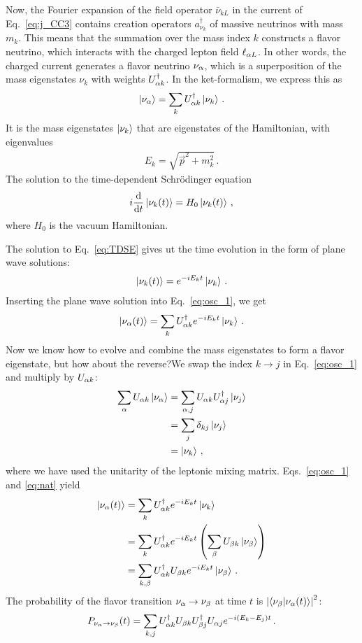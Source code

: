 Now, the Fourier expansion of the field operator $\bar{\nu}_{k L}$ in the current of Eq.~\ref{eq:j_CC3} contains creation operators $a^\dagger_{\nu_k}$
of massive neutrinos with mass $m_k$. This means that the summation over the mass index $k$ constructs a flavor neutrino, which interacts with the charged lepton field $\ell_{\alpha L}$.
In other words, the charged current generates a flavor neutrino $\nu_\alpha$, which is a superposition of the mass eigenstates 
$\nu_k$ with weights $U_{\alpha k}^\dagger$. In the ket-formalism, we express this as
\begin{align}\label{eq:osc_1}
    \ket{\nu_\alpha} = \sum_k U^\dagger_{\alpha k} \ket{\nu_k}\,.
\end{align}
It is the mass eigenstates $\ket{\nu_k}$ that are eigenstates of the Hamiltonian, with eigenvalues
\begin{align}\label{eq:disp}
    E_k = \sqrt{\vec{p}^2 + m_k^2}\,.
\end{align}
The solution to the time-dependent Schrödinger equation 
\begin{align}\label{eq:TDSE}
    i \dv{}{t} \ket{\nu_k(t)} = H_0\ket{\nu_k(t)}\,,
\end{align}
where $H_0$ is the vacuum Hamiltonian. 

The solution to Eq.~\ref{eq:TDSE} gives ut the time evolution
in the form of plane wave solutions: 
\begin{align}
    \ket{\nu_k(t)} = e^{-iE_kt}\ket{\nu_k}\,.
\end{align}
Inserting the plane wave solution into Eq.~\ref{eq:osc_1}, we get 
\begin{align}\label{eq:nat}
    \ket{\nu_\alpha(t)} = \sum_k U^\dagger_{\alpha k} e^{-iE_kt}\ket{\nu_k}\,.
\end{align}
Now we know how to evolve and combine the mass eigenstates to form a flavor eigenstate, but how about the reverse?We swap the index $k\to j$ in Eq.~\ref{eq:osc_1} and multiply by $U_{\alpha k}$:
\begin{align}\label{eq:osc_k}
    \sum_\alpha U_{\alpha k}\ket{\nu_\alpha} &= \sum_{\alpha, j} U_{\alpha k} U_{\alpha j}^\dagger \ket{\nu_j} \nonumber \\
                              &= \sum_{j} \delta_{kj} \ket{\nu_j} \nonumber \\
                              &= \ket{\nu_k}\,,
\end{align}
where we have used the unitarity of the leptonic mixing matrix. Eqs.~\ref{eq:osc_1} and \ref{eq:nat} yield 
\begin{align}
    \ket{\nu_\alpha(t)} &= \sum_k U^\dagger_{\alpha k} e^{-iE_kt}\ket{\nu_k} \nonumber \\
                 &= \sum_k U^\dagger_{\alpha k} e^{-iE_kt}\left(\sum_\beta U_{\beta k}\ket{\nu_\beta}\right) \nonumber \\
                 &= \sum_{k,\beta} U^\dagger_{\alpha k}U_{\beta k} e^{-iE_kt} \ket{\nu_\beta}\,.
\end{align}
The probability of the flavor transition $\nu_\alpha \to \nu_\beta$ at time $t$ is $\abs{\bra{\nu_\beta}\ket{\nu_\alpha (t)}}^2$:
\begin{align}
    P_{\nu_\alpha \to \nu_\beta}(t) = \sum_{k,j} U^\dagger_{\alpha k}U_{\beta k}U^\dagger_{\beta j}U_{\alpha j} e^{-i(E_k-E_j)t}\,.
\end{align}

